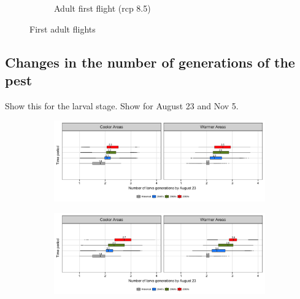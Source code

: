 \documentclass[12pt]{article}
\theoremstyle{plain}
\theoremstyle{definition}
\theoremstyle{definition}
\begin{document}
\begin{figure}[h!]
\begin{subfigure}[b]{0.5\textwidth}
        \caption{Adult first flight (rcp 8.5)}
        \label{fig:aff_85}
    \end{subfigure}
    \caption{First adult flights}\label{fig:First_adult_flights}
\end{figure}



\pagebreak

\subsection{Changes in the number of generations of the pest}
Show this for the larval stage. Show for August 23 and Nov 5.

\begin{figure}[h!]
    \centering
    \begin{subfigure}[b]{0.45\textwidth}
        \includegraphics[width=\textwidth]{figures/Larva_Gen_Aug_rcp45}
    \end{subfigure}
    \begin{subfigure}[b]{0.45\textwidth}
        \includegraphics[width=\textwidth]{figures/Larva_Gen_Aug_rcp85}
    \end{subfigure}\\    

\end{figure}
\end{document}
